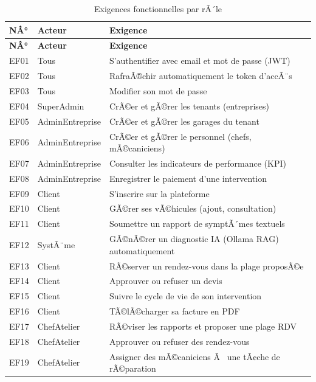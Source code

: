 \begin{longtable}{|p{0.8cm}|p{2.8cm}|p{8cm}|}
\caption{Exigences fonctionnelles par rÃ´le}\label{tab:exigences}\\
\hline
\rowcolor{gray!20}
\textbf{NÂ°} & \textbf{Acteur} & \textbf{Exigence} \\
\hline
\endfirsthead
\hline
\rowcolor{gray!20}
\textbf{NÂ°} & \textbf{Acteur} & \textbf{Exigence} \\
\hline
\endhead
\hline
\endlastfoot
EF01 & Tous & S'authentifier avec email et mot de passe (JWT) \\[2pt]\hline
EF02 & Tous & RafraÃ®chir automatiquement le token d'accÃ¨s \\[2pt]\hline
EF03 & Tous & Modifier son mot de passe \\[2pt]\hline
EF04 & SuperAdmin & CrÃ©er et gÃ©rer les tenants (entreprises) \\[2pt]\hline
EF05 & AdminEntreprise & CrÃ©er et gÃ©rer les garages du tenant \\[2pt]\hline
EF06 & AdminEntreprise & CrÃ©er et gÃ©rer le personnel (chefs, mÃ©caniciens) \\[2pt]\hline
EF07 & AdminEntreprise & Consulter les indicateurs de performance (KPI) \\[2pt]\hline
EF08 & AdminEntreprise & Enregistrer le paiement d'une intervention \\[2pt]\hline
EF09 & Client & S'inscrire sur la plateforme \\[2pt]\hline
EF10 & Client & GÃ©rer ses vÃ©hicules (ajout, consultation) \\[2pt]\hline
EF11 & Client & Soumettre un rapport de symptÃ´mes textuels \\[2pt]\hline
EF12 & SystÃ¨me & GÃ©nÃ©rer un diagnostic IA (Ollama RAG) automatiquement \\[2pt]\hline
EF13 & Client & RÃ©server un rendez-vous dans la plage proposÃ©e \\[2pt]\hline
EF14 & Client & Approuver ou refuser un devis \\[2pt]\hline
EF15 & Client & Suivre le cycle de vie de son intervention \\[2pt]\hline
EF16 & Client & TÃ©lÃ©charger sa facture en PDF \\[2pt]\hline
EF17 & ChefAtelier & RÃ©viser les rapports et proposer une plage RDV \\[2pt]\hline
EF18 & ChefAtelier & Approuver ou refuser des rendez-vous \\[2pt]\hline
EF19 & ChefAtelier & Assigner des mÃ©caniciens Ã  une tÃ¢che de rÃ©paration \\[2pt]\hline

\end{longtable}
